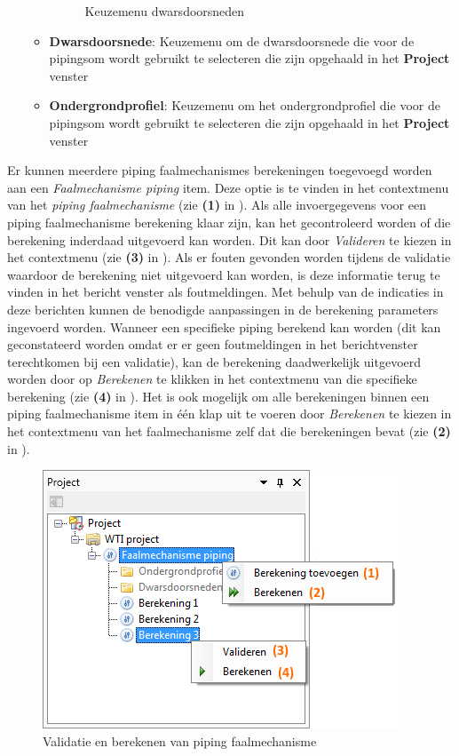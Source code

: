 \begin{enumerate}
\begin{itemize}
\begin{figure} [H]
	\caption{Keuzemenu dwarsdoorsneden}
	\label{fig:fig5.6}
\end{figure}
	\item \textbf{Dwarsdoorsnede}: Keuzemenu om de dwarsdoorsnede die voor de pipingsom wordt gebruikt te selecteren die zijn opgehaald in het \textbf{Project} venster
	\item \textbf{Ondergrondprofiel}: Keuzemenu om het ondergrondprofiel die voor de pipingsom wordt gebruikt te selecteren die zijn opgehaald in het \textbf{Project} venster
	\end{itemize}

\end{enumerate}


Er kunnen meerdere piping faalmechanismes berekeningen toegevoegd worden aan een \textit{Faalmechanisme piping} item. Deze optie is te vinden in het contextmenu van het \textit{piping faalmechanisme} (zie \textbf{(1)} in ).
Als alle invoergegevens voor een piping faalmechanisme berekening klaar zijn, kan het gecontroleerd worden of die berekening inderdaad uitgevoerd kan worden. Dit kan door \textit{Valideren} te kiezen in het contextmenu (zie \textbf{(3)} in ). Als er fouten gevonden worden tijdens de validatie waardoor de berekening niet uitgevoerd kan worden, is deze informatie terug te vinden in het bericht venster als foutmeldingen. Met behulp van de indicaties in deze berichten kunnen de benodigde aanpassingen in de berekening parameters ingevoerd worden. 
Wanneer een specifieke piping berekend kan worden (dit kan geconstateerd worden omdat er er geen foutmeldingen in het berichtvenster terechtkomen bij een validatie), kan de berekening daadwerkelijk uitgevoerd worden door op \textit{Berekenen} te klikken in het contextmenu van die specifieke berekening (zie \textbf{(4)} in ).
Het is ook mogelijk om alle berekeningen binnen een piping faalmechanisme item in één klap uit te voeren door \textit{Berekenen} te kiezen in het contextmenu van het faalmechanisme zelf dat die berekeningen bevat (zie \textbf{(2)} in ).

\begin{figure} [H]
	\centering
		\includegraphics{figures/chapter_piping/validateAndRunPiping}
	\caption{Validatie en berekenen van piping faalmechanisme}
	\label{fig:piping.validateAndRunPiping}
\end{figure}


